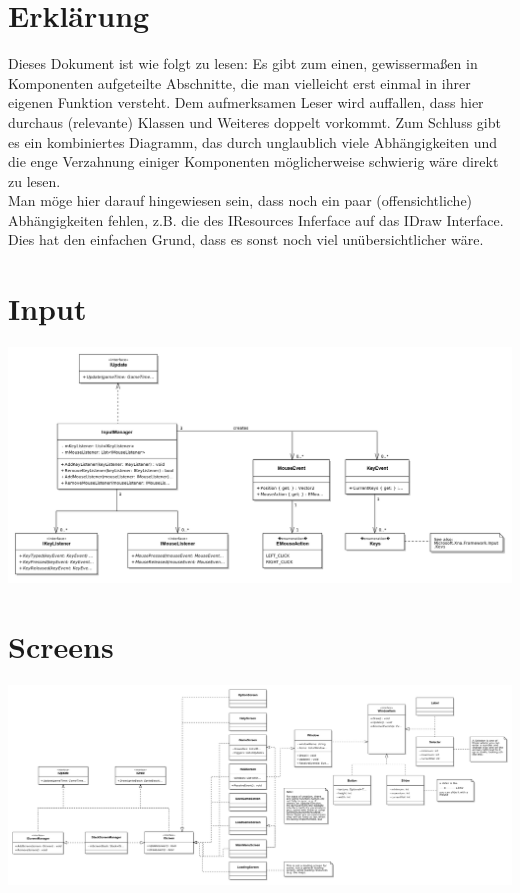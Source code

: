 \documentclass[12pt]{article}
\begin{document}
\tableofcontents
\newpage


\section{Erklärung}
Dieses Dokument ist wie folgt zu lesen: Es gibt zum einen, gewissermaßen in
Komponenten aufgeteilte Abschnitte, die man vielleicht erst einmal in ihrer
eigenen Funktion versteht. Dem aufmerksamen Leser wird auffallen, dass hier
durchaus (relevante) Klassen und Weiteres doppelt vorkommt. Zum Schluss
gibt es ein kombiniertes Diagramm, das durch unglaublich viele Abhängigkeiten
und die enge Verzahnung einiger Komponenten möglicherweise schwierig
wäre direkt zu lesen. \\

Man möge hier darauf hingewiesen sein, dass noch ein paar (offensichtliche)
Abhängigkeiten fehlen, z.B. die des IResources Inferface auf das IDraw
Interface. Dies hat den einfachen Grund, dass es sonst noch viel
unübersichtlicher wäre.

\section{Input}
\includegraphics[width=\textwidth]{Input}
\newline

\section{Screens}
\includegraphics[width=\textwidth]{Screens}
\newline
\end{document}

